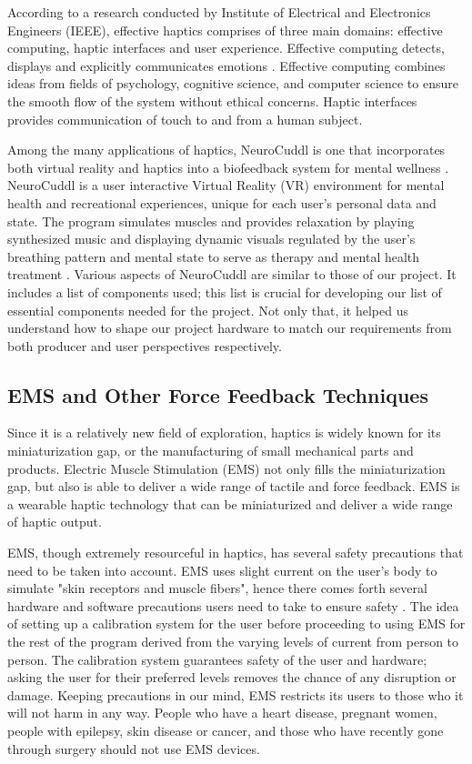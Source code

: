 According to a research conducted by Institute of Electrical and Electronics Engineers (IEEE), effective haptics comprises of three main domains: effective computing, haptic interfaces and user experience. Effective computing detects, displays and explicitly communicates emotions \cite{affHaptics}. Effective computing combines ideas from fields of psychology, cognitive science, and computer science to ensure the smooth flow of the system without ethical concerns. Haptic interfaces provides communication of touch to and from a human subject.


Among the many applications of haptics, NeuroCuddl is one that incorporates both virtual reality and haptics into a biofeedback system for mental wellness \cite{neuroCuddl}. NeuroCuddl is a user interactive Virtual Reality (VR) environment for mental health and recreational experiences, unique for each user’s personal data and state. The program simulates muscles and provides relaxation by playing synthesized music and displaying dynamic visuals regulated by the user’s breathing pattern and mental state to serve as therapy and mental health treatment \cite{neuroCuddl}. Various aspects of NeuroCuddl are similar to those of our project. It includes a list of components used; this list is crucial for developing our list of essential components needed for the project. Not only that, it helped us understand how to shape our project hardware to match our requirements from both producer and user perspectives respectively.

\subsection{EMS and Other Force Feedback Techniques}

Since it is a relatively new field of exploration, haptics is widely known for its miniaturization gap, or the manufacturing of small mechanical parts and products. Electric Muscle Stimulation (EMS) not only fills the miniaturization gap, but also is able to deliver a wide range of tactile and force feedback. EMS is a wearable haptic technology that can be miniaturized and deliver a wide range of haptic output.


EMS, though extremely resourceful in haptics, has several safety precautions that need to be taken into account. EMS uses slight current on the user’s body to simulate "skin receptors and muscle fibers", hence there comes forth several hardware and software precautions users need to take to ensure safety \cite{toolkit}. The idea of setting up a calibration system for the user before proceeding to using EMS for the rest of the program derived from the varying levels of current from person to person. The calibration system guarantees safety of the user and hardware; asking the user for their preferred levels removes the chance of any disruption or damage. Keeping precautions in our mind, EMS restricts its users to those who it will not harm in any way. People who have a heart disease, pregnant women, people with epilepsy, skin disease or cancer, and those who have recently gone through surgery should not use EMS devices.


